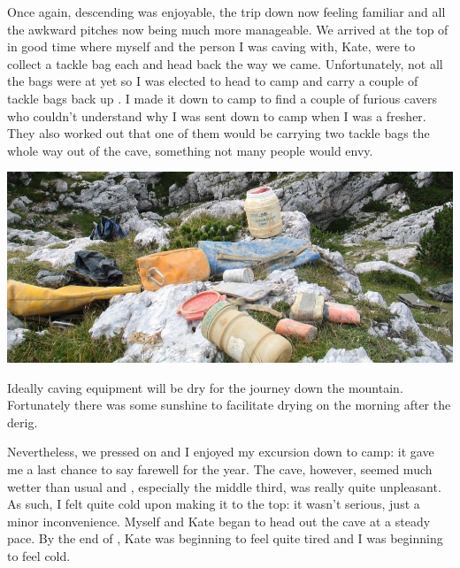 Once again, descending was enjoyable, the trip down now feeling familiar
and all the awkward pitches now being much more manageable. We arrived
at the top of  in good time where myself and the person I
was caving with, Kate, were to collect a tackle bag each and head back
the way we came. Unfortunately, not all the bags were at 
yet so I was elected to head to camp and carry a couple of tackle bags
back up . I made it down to camp to find a couple of
furious cavers who couldn't understand why I was sent down to camp when
I was a fresher. They also worked out that one of them would be carrying
two tackle bags the whole way out of the cave, something not many people
would envy.

\begin{pagefigure}
\checkoddpage \ifoddpage \forcerectofloat \else \forceversofloat \fi
   \centering
\includegraphics[width = \textwidth]{2011/alex_pitcher_award/2011-08-10-11.37.14-Jarvist Frost-CanonG5-IMG_0186 - Drying Underground Camp gear in the Sun--orig_1050p.jpg}
\caption{Ideally caving equipment will be dry for the journey down the mountain. Fortunately there was some sunshine to facilitate drying on the morning after the derig. } \label{ug gear drying}
\end{pagefigure}

Nevertheless, we pressed on and I enjoyed my excursion down
to camp: it gave me a last chance to say farewell for the year. The
cave, however, seemed much wetter than usual and ,
especially the middle third, was really quite unpleasant. As such, I
felt quite cold upon making it to the top: it wasn't serious, just a
minor inconvenience. Myself and Kate began to head out the cave at a
steady pace. By the end of , Kate was beginning to feel quite
tired and I was beginning to feel cold.

